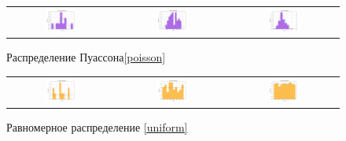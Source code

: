 \documentclass[a4paper,14pt]{article}
\begin{document}
	\begin{figure}[H]
		\centering
		\begin{tabular}{c c c}
			\includegraphics[height = 0.25\textheight, width = 0.31\textwidth]{../image/lab1/lab1_poisson_10.png}
			& \includegraphics[height = 0.25\textheight, width = 0.31\textwidth]{../image/lab1/lab1_poisson_50.png}
			& \includegraphics[height = 0.25\textheight, width = 0.31\textwidth]{../image/lab1/lab1_poisson_1000.png}
		\end{tabular}
		\caption{Распределение Пуассона\eqref{poisson}}
		\label{fig:poisson}
	\end{figure}
	
	\begin{figure}[H]
		\centering
		\begin{tabular}{c c c}
			\includegraphics[height = 0.25\textheight, width = 0.31\textwidth]{../image/lab1/lab1_uniform_10.png}
			& \includegraphics[height = 0.25\textheight, width = 0.31\textwidth]{../image/lab1/lab1_uniform_50.png}
			& \includegraphics[height = 0.25\textheight, width = 0.31\textwidth]{../image/lab1/lab1_uniform_1000.png}
		\end{tabular}
		\caption{Равномерное распределение \eqref{uniform}}
		\label{fig:uniform}
	\end{figure}
\end{document}

